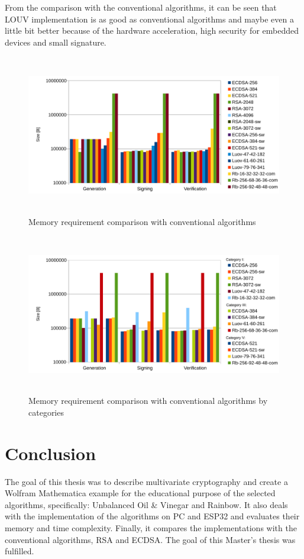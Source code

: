 \documentclass[thesis=M,english]{FITthesis}[2019/12/23]
\begin{document}
\bigskip
\noindent
From the comparison with the conventional algorithms, it can be seen that LOUV implementation is as good as conventional algorithms and maybe even a little bit better because of the hardware acceleration, high security for embedded devices and small signature.

\bigskip
\begin{figure}[H]
\centering
\includegraphics[width=13cm,height=7cm]{images/mem-all.pdf}
\caption{Memory requirement comparison with conventional algorithms}
\label{mem-all}
\end{figure}

\bigskip\bigskip\bigskip
\begin{figure}[H]
\centering
\includegraphics[width=13cm,height=7cm]{images/mem-category-all.pdf}
\caption{Memory requirement comparison with conventional algorithms by categories}
\label{mem-category-all}
\end{figure}

\chapter{Conclusion}
The goal of this thesis was to describe multivariate cryptography and create a Wolfram Mathematica example for the educational purpose of the selected algorithms, specifically: Unbalanced Oil \& Vinegar and Rainbow. It also deals with the implementation of the algorithms on PC and ESP32 and evaluates their memory and time complexity. Finally, it compares the implementations with the conventional algorithms, RSA and ECDSA. The goal of this Master's thesis was fulfilled.
\end{document}
